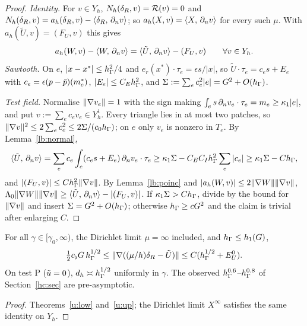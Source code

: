 \begin{proof}
\emph{Identity.} For $v\in Y_h$, $N_h(\delta_R,v)=\mathcal R(v)=0$ and $N_h(\delta_R,v)=a_h(\delta_R,v)-\langle \delta_R,\, \partial_n v\rangle$; so $a_h(X,v)=\langle X,\, \partial_n v\rangle$ for every such $\mu$. With $a_h(\tilde U,v)=(F_U,v)$ this gives
\[
a_h(W,v)-\langle W,\, \partial_n v\rangle=\langle \tilde U,\, \partial_n v\rangle-(F_U,v)\qquad\forall v\in Y_h .
\]
\emph{Sawtooth.} On $e$, $|x-x^\ast|\le h_\Gamma^2/4$ and $e_r(x^\ast)\cdot\tau_e=\epsilon s/|x|$, so $\tilde U\cdot\tau_e=c_es+E_e$ with $c_e=\epsilon(p-\bar p)(m_e^\ast)$, $|E_e|\le C_Eh_\Gamma^2$, and $\Sigma:=\sum_ec_e^2|e|=G^2+O(h_\Gamma)$.

\emph{Test field.} Normalise $\lVert \nabla v_e\rVert=1$ with the sign making $\int_es\,\partial_n v_e\cdot\tau_e=m_e\ge\kappa_1|e|$, and put $v:=\sum_ec_ev_e\in Y_h^1$. Every triangle lies in at most two patches, so $\lVert \nabla v\rVert^2\le2\sum_ec_e^2\le2\Sigma/(c_0h_\Gamma)$; on $e$ only $v_e$ is nonzero in $T_e$. By Lemma~\ref{lb:normal},
\[
\langle \tilde U,\, \partial_n v\rangle=\sum_ec_e\int_e(c_es+E_e)\,\partial_n v_e\cdot\tau_e\ge\kappa_1\Sigma-C_EC_Ih_\Gamma^2\sum_e|c_e|\ge\kappa_1\Sigma-Ch_\Gamma,
\]
and $|(F_U,v)|\le Ch_\Gamma^2\lVert \nabla v\rVert$. By Lemma~\ref{lb:poinc} and $|a_h(W,v)|\le2\lVert \nabla W\rVert\lVert \nabla v\rVert$, $\Lambda_0\lVert \nabla W\rVert\lVert \nabla v\rVert\ge\langle \tilde U,\, \partial_n v\rangle-|(F_U,v)|$. If $\kappa_1\Sigma>Ch_\Gamma$, divide by the bound for $\lVert \nabla v\rVert$ and insert $\Sigma=G^2+O(h_\Gamma)$; otherwise $h_\Gamma\ge cG^2$ and the claim is trivial after enlarging $C$.
\end{proof}

\begin{corollary}\label{u:two}
For all $\gamma\in[\gamma_0,\infty)$, the Dirichlet limit $\mu=\infty$ included, and $h_\Gamma\le h_1(G)$,
\[
\tfrac12c_\flat G\,h_\Gamma^{1/2}\le\lVert \nabla((\mu/h)\delta_R-\tilde U)\rVert\le C(h_\Gamma^{1/2}+E^0_U).
\]
On test P ($\tilde u=0$), $d_h\asymp h_\Gamma^{1/2}$ uniformly in $\gamma$. The observed $h_\Gamma^{0.6}$--$h_\Gamma^{0.8}$ of Section~\ref{hc:sec} are pre-asymptotic.
\end{corollary}

\begin{proof}
Theorems~\ref{u:low} and~\ref{u:up}; the Dirichlet limit $X^\infty$ satisfies the same identity on $Y_h$.
\end{proof}


